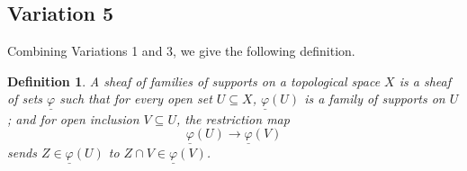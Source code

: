 \documentclass[12pt]{book}
\theoremstyle{plain}
\newtheorem{definition}{Definition}[section]
\begin{document}
\setcounter{page}{222}

\subsection{Variation 5}
Combining Variations 1 and 3, we give the following definition.

\begin{definition}
A \textit{sheaf of families of supports} on a topological space \(X\) is a sheaf of sets \(\underline{\varphi}\) such that for every open set \(U\subseteq X\), \(\underline{\varphi}(U)\) is a family of supports on \(U\); and for open inclusion \(V\subseteq U\), the restriction map
\[
\underline{\varphi}(U)\to\underline{\varphi}(V)
\]
sends \(Z\in\underline{\varphi}(U)\) to \(Z\cap V\in\underline{\varphi}(V)\).
\end{definition}
\end{document}
